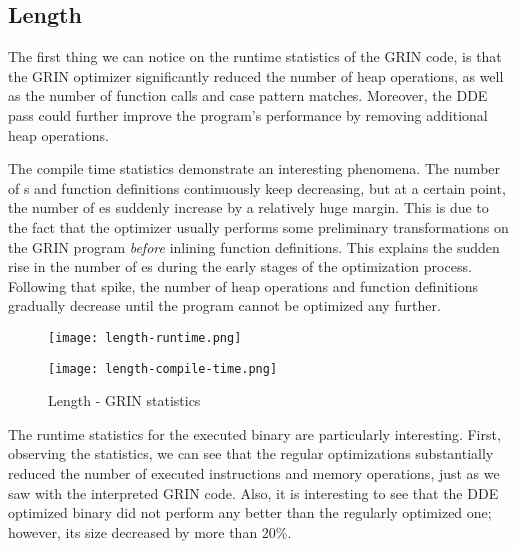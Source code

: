 \documentclass[main.tex]{subfiles}
\begin{document}
	
	\subsection{Length}
	
	The first thing we can notice on the runtime statistics of the GRIN code, is that the GRIN optimizer significantly reduced the number of heap operations, as well as the number of function calls and case pattern matches. Moreover, the DDE pass could further improve the program's performance by removing additional heap operations.
	
	The compile time statistics demonstrate an interesting phenomena. The number of s and function definitions continuously keep decreasing, but at a certain point, the number of es suddenly increase by a relatively huge margin. This is due to the fact that the optimizer usually performs some preliminary transformations on the GRIN program \emph{before} inlining function definitions. This explains the sudden rise in the number of es during the early stages of the optimization process. Following that spike, the number of heap operations and function definitions gradually decrease until the program cannot be optimized any further.
	
	\begin{figure}[h]
		\hspace{-0.5cm}
		\renewcommand{\figurename}{Diagram}
		\caption{Length - GRIN statistics}
		\label{diagram:length-stats}
		\addtocounter{figure}{-1}
		\begin{minipage}{0.5\textwidth}
			\label{diagram:length-stats-rt}
			\texttt{[image: length-runtime.png]}
		\end{minipage}
		\begin{minipage}{0.5\textwidth}
			\label{diagram:length-stats-ct}
			\texttt{[image: length-compile-time.png]}
		\end{minipage}
	\end{figure}

	The runtime statistics for the executed binary are particularly interesting. First, observing the  statistics, we can see that the regular optimizations substantially reduced the number of executed instructions and memory operations, just as we saw with the interpreted GRIN code. Also, it is interesting to see that the DDE optimized binary did not perform any better than the regularly optimized one;  however, its size decreased by more than 20\%. 
	
\end{document}
